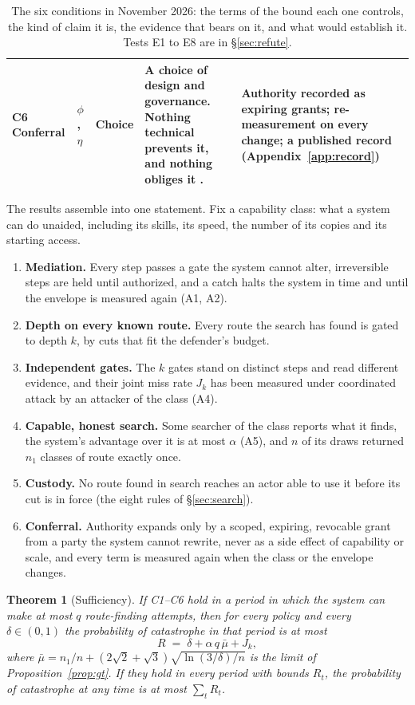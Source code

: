 \documentclass[10pt,twocolumn]{article}
\theoremstyle{plain}
\newtheorem{theorem}{Theorem}
\theoremstyle{definition}
\begin{document}
\begin{table}[t]
\begin{tabularx}{\textwidth}{@{}P{0.86in}P{0.4in}P{0.72in}LP{1.5in}@{}}
C6 Conferral & $\phi$, $\eta$ & Choice & A choice of design and governance. Nothing technical prevents it, and nothing obliges it \cite{kulveit2025}. & Authority recorded as expiring grants; re-measurement on every change; a published record (Appendix~\ref{app:record})\\
\bottomrule
\end{tabularx}
\caption{The six conditions in November 2026: the terms of the bound each one controls, the
kind of claim it is, the evidence that bears on it, and what would establish it. Tests E1 to
E8 are in \S\ref{sec:refute}.}
\label{tab:status}
\end{table}

The results assemble into one statement. Fix a capability class: what a system can do
unaided, including its skills, its speed, the number of its copies and its starting access.

\begin{enumerate}[label=\textbf{C\arabic*.},leftmargin=2.1em,itemsep=1.5pt,topsep=3pt]
\item \textbf{Mediation.} Every step passes a gate the system cannot alter, irreversible
steps are held until authorized, and a catch halts the system in time and until the envelope
is measured again (A1, A2).
\item \textbf{Depth on every known route.} Every route the search has found is gated to
depth $k$, by cuts that fit the defender's budget.
\item \textbf{Independent gates.} The $k$ gates stand on distinct steps and read different
evidence, and their joint miss rate $J_{k}$ has been measured under coordinated attack by an
attacker of the class (A4).
\item \textbf{Capable, honest search.} Some searcher of the class reports what it finds, the
system's advantage over it is at most $\alpha$ (A5), and $n$ of its draws returned $n_{1}$
classes of route exactly once.
\item \textbf{Custody.} No route found in search reaches an actor able to use it before its
cut is in force (the eight rules of \S\ref{sec:search}).
\item \textbf{Conferral.} Authority expands only by a scoped, expiring, revocable grant from
a party the system cannot rewrite, never as a side effect of capability or scale, and every
term is measured again when the class or the envelope changes.
\end{enumerate}

\begin{theorem}[Sufficiency]\label{thm:main}
If C1--C6 hold in a period in which the system can make at most $q$ route-finding attempts,
then for every policy and every $\delta\in(0,1)$ the probability of catastrophe in that
period is at most
\[
R\;=\;\delta+\alpha\,q\,\bar\mu+J_{k},
\]
where $\bar\mu=n_{1}/n+(2\sqrt{2}+\sqrt{3})\sqrt{\ln(3/\delta)/n}$ is the limit of
Proposition~\ref{prop:gt}. If they hold in every period with bounds $R_{t}$, the probability of catastrophe at any time
is at most $\sum_{t}R_{t}$.
\end{theorem}
\end{document}
